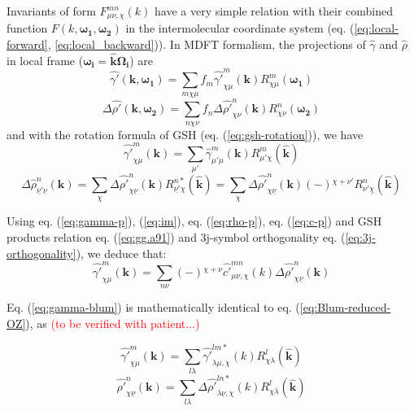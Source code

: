 Invariants of form $F_{\mu\nu,\chi}^{mn}(k)$ have a very simple relation
with their combined function $F(k,\boldsymbol{\omega_{1}},\boldsymbol{\omega_{2}})$
in the intermolecular coordinate system (eq. (\ref{eq:local-forward},
\ref{eq:local_backward})). In MDFT formalism, the projections of
$\hat{\gamma}$ and $\hat{\rho}$ in local frame ($\boldsymbol{\omega_{i}}=\hat{\mathbf{k}}\mathbf{\Omega_{i}}$)
are
\begin{equation}
\hat{\gamma'}(\mathbf{k},\boldsymbol{\omega_{1}})=\sum_{m\chi\mu}f_{m}\hat{\gamma'}_{\chi\mu}^{m}(\mathbf{k})R_{\chi\mu}^{m}(\boldsymbol{\omega_{1}})\label{eq:gamma-projection-local}
\end{equation}
\begin{equation}
\Delta\hat{\rho'}(\mathbf{k},\boldsymbol{\omega_{2}})=\sum_{n\chi\nu}f_{n}\Delta\hat{\rho'}_{\chi\nu}^{n}(\mathbf{k})R_{\chi\nu}^{n}(\mathbf{\boldsymbol{\omega_{2}}})\label{eq:delta-rho-projection-local}
\end{equation}
and with the rotation formula of GSH (eq. (\ref{eq:gsh-rotation})),
we have 
\begin{equation}
\hat{\gamma'}_{\chi\mu}^{m}(\mathbf{k})=\sum_{\mu'}\hat{\gamma}_{\mu'\mu}^{m}(\mathbf{k})R_{\mu'\chi}^{m}(\hat{\mathbf{k}})\label{eq:gamma-p}
\end{equation}
\begin{equation}
\Delta\hat{\rho}_{\underline{\nu'}\underline{\nu}}^{n}(\mathbf{k})=\sum_{\chi}\Delta\hat{\rho'}_{\chi\underline{\nu}}^{n}(\mathbf{k})R_{\underline{\nu'}\chi}^{n*}(\hat{\mathbf{k}})=\sum_{\chi}\Delta\hat{\rho'}_{\chi\underline{\nu}}^{n}(\mathbf{k})\left(-\right){}^{\chi+\nu'}R_{\nu'\underline{\chi}}^{n}(\hat{\mathbf{k}})\label{eq:rho-p}
\end{equation}


Using eq. (\ref{eq:gamma-p}), (\ref{eq:im}), eq. (\ref{eq:rho-p}),
eq. (\ref{eq:c-p}) and GSH products relation eq. (\ref{eq:gg.a91})
and 3j-symbol orthogonality eq. (\ref{eq:3j-orthogonality}), we deduce
that:
\begin{equation}
\hat{\gamma'}_{\chi\mu}^{m}(\mathbf{k})=\sum_{n\nu}\left(-\right){}^{\chi+\nu}\hat{c'}_{\mu\nu,\chi}^{mn}(k)\Delta\hat{\rho'}_{\chi\underline{\nu}}^{n}(\mathbf{k})\label{eq:gamma-blum}
\end{equation}


Eq. (\ref{eq:gamma-blum}) is mathematically identical to eq. (\ref{eq:Blum-reduced-OZ}),
as \textcolor{red}{(to be verified with patient...)}

\begin{equation}
\hat{\gamma'}_{\chi\mu}^{m}(\mathbf{k})=\sum_{l\lambda}\hat{\gamma'}_{\lambda\mu,\chi}^{lm*}(k)R_{\chi\lambda}^{l}(\hat{\mathbf{k}})
\end{equation}
\begin{equation}
\hat{\rho'}_{\chi\underline{\nu}}^{n}(\mathbf{k})=\sum_{l\lambda}\Delta\hat{\rho'}_{\lambda\underline{\nu},\chi}^{ln*}(k)R_{\chi\lambda}^{l}(\hat{\mathbf{k}})
\end{equation}



